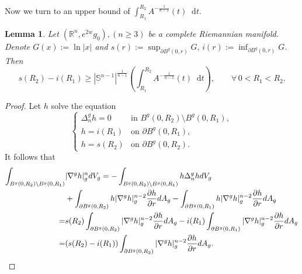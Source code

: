 \documentclass[12pt]{amsart}
\theoremstyle{plain}
\newtheorem{lemma}[theorem]{Lemma}
\theoremstyle{definition}
\theoremstyle{remark}     %
\numberwithin{equation}{section}
\newcommand{\dd}{\mathop{}\!\mathrm{d}}%
\newcommand{\nablag}{\nabla^g} %
\begin{document}
Now we turn to an upper bound of $\int_{R_1}^{R_2} A^{-\frac{1}{n-1}}(t)\dd t$.
\begin{lemma}\label{lemma. upper bound of integral of A(r)}
    Let $(\mathbb{R}^n,e^{2w}g_0),(n\geq 3)$ be a complete Riemannian manifold. Denote $G(x):=\ln |x|$ and $s(r):=\sup_{\partial B^g(0,r)}G,\, i(r):=\inf_{\partial B^g(0,r)}G $. Then
    \[
        s(R_2)-i(R_1)
        \geq        
        |\mathbb{S}^{n-1}|^{\frac{1}{n-1}}
        \left(
        \int_{R_1}^{R_2} A^{-\frac{1}{n-1}}(t)\dd t
        \right),\qquad 
        \forall\, 0<R_1<R_2.
    \]
\end{lemma}
\begin{proof}
    Let $h$ solve the equation 
    \[
        \begin{cases}
            \Delta_n^g h=0  &\text{in } B^g(0,R_2)\setminus B^g(0,R_1),\\
            h=i(R_1) &\text{on } \partial B^g(0,R_1),\\
            h=s(R_2) &\text{on } \partial B^g(0,R_2).
        \end{cases}
    \]
    It follows that
    \begin{align}
        \int_{B^g(0,R_2)\setminus B^g(0,R_1)}&|\nabla^g h|_g^n dV_g\notag
        =-\int_{B^g(0,R_2)\setminus B^g(0,R_1)}h\Delta_n^g h dV_g \\ \notag
        &+\int_{\partial B^g(0,R_2)} h|\nablag h|_g^{n-2}\frac{\partial h}{\partial r} dA_g
        -\int_{\partial B^g(0,R_1)} h|\nablag h|_g^{n-2}\frac{\partial h}{\partial r} dA_g \notag\\
        =&s(R_2)\int_{\partial B^g(0,R_2)} |\nablag h|_g^{n-2}\frac{\partial h}{\partial r} dA_g
        -i(R_1)\int_{\partial B^g(0,R_1)} |\nablag h|_g^{n-2}\frac{\partial h}{\partial r} dA_g \notag\\
        =&(s(R_2)-i(R_1))\int_{\partial B^g(0,R_2)} |\nablag h|_g^{n-2}\frac{\partial h}{\partial r} dA_g. \label{eq. n-Dirichlet energy of h}
    \end{align}


\end{proof}
\end{document}
